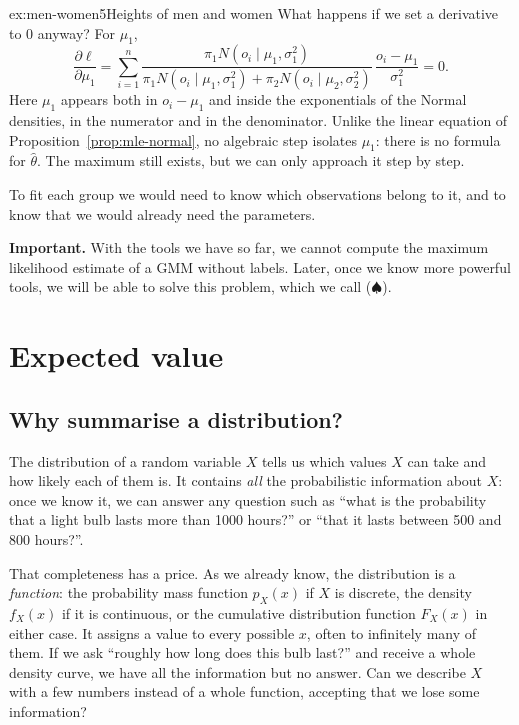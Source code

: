 \documentclass[a4paper,12pt,oneside]{report}
\begin{document}
\begin{framedexamplepart}{ex:men-women}{5}{Heights of men and women}
What happens if we set a derivative to $0$ anyway? For $\mu_1$,
\[
\frac{\partial\ell}{\partial\mu_1}=\sum_{i=1}^n
\frac{\pi_1N(o_i\mid\mu_1,\sigma_1^2)}
{\pi_1N(o_i\mid\mu_1,\sigma_1^2)+\pi_2N(o_i\mid\mu_2,\sigma_2^2)}\,
\frac{o_i-\mu_1}{\sigma_1^2}=0 .
\]
Here $\mu_1$ appears both in $o_i-\mu_1$ and inside the exponentials of the
Normal densities, in the numerator and in the denominator. Unlike the linear
equation of Proposition~\ref{prop:mle-normal}, no algebraic step isolates $\mu_1$:
there is no formula for $\hat\theta$. The maximum still exists, but we can
only approach it step by step.
\end{framedexamplepart}

To fit each group we would need to know which observations belong to it,
and to know that we would already need the parameters.

\begin{importantbox}
\label{box:spade}
\textbf{Important.} With the tools we have so far, we cannot compute the
maximum likelihood estimate of a GMM without labels. Later, once we know
more powerful tools, we will be able to solve this problem, which we call
($\spadesuit$).
\end{importantbox}

\chapter{Expected value}

\section{Why summarise a distribution?}

The distribution of a random variable $X$ tells us which values $X$ can
take and how likely each of them is. It contains \emph{all} the
probabilistic information about $X$: once we know it, we can answer any
question such as ``what is the probability that a light bulb lasts more
than 1000 hours?'' or ``that it lasts between 500 and 800 hours?''.

That completeness has a price. As we already know, the distribution is a
\emph{function}: the
probability mass function $p_X(x)$ if $X$ is discrete, the density
$f_X(x)$ if it is continuous, or the cumulative distribution function
$F_X(x)$ in either case. It assigns a value to every possible $x$, often to
infinitely many of them. If we ask ``roughly how long does this bulb last?''
and receive a whole density curve, we have all the information but no
answer. Can we describe $X$ with a few numbers instead of a whole function,
accepting that we lose some information?
\end{document}
